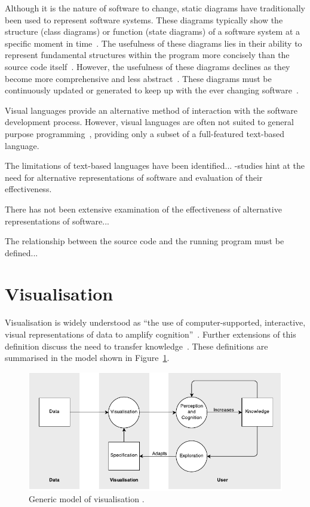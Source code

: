 Although it is the nature of software to change, static diagrams have traditionally been used to represent software systems. These diagrams typically show the structure (class diagrams) or function (state diagrams) of a software system at a specific moment in time~\cite{Rumbaugh2004}. The usefulness of these diagrams lies in their ability to represent fundamental structures within the program more concisely than the source code itself~. However, the usefulness of these diagrams declines as they become more comprehensive and less abstract~. These diagrams must be continuously updated or generated to keep up with the ever changing software~.

Visual languages provide an alternative method of interaction with the software development process. However, visual languages are often not suited to general purpose programming~\cite{Myers1989}, providing only a subset of a full-featured text-based language.

The limitations of text-based languages have been identified...
-studies hint at the need for alternative representations of software and evaluation of their effectiveness.

There has not been extensive examination of the effectiveness of alternative representations of software...

The relationship between the source code and the running program must be defined...

\section{Visualisation}

Visualisation is widely understood as ``the use of computer-supported, interactive, visual representations of data to amplify cognition''~\cite{Card1999}. Further extensions of this definition discuss the need to transfer knowledge~\cite{Burkhard}. These definitions are summarised in the model shown in Figure~\ref{fig:model-of-visualisation}.

\begin{figure}
  \centering \includegraphics[width=\columnwidth]{../images/diagrams/wijk-model-of-visualisation.pdf}
  \caption{Generic model of visualisation \protect\cite{VanWijk2005}.}
\label{fig:model-of-visualisation}
\end{figure} 

